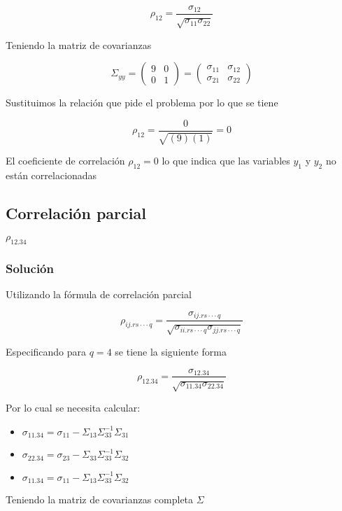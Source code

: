 $$
\rho_{12}=\frac{\sigma_{12}}{\sqrt{\sigma_{11}\sigma_{22}}}
$$

Teniendo la matriz de covarianzas

$$
\Sigma_{yy}=
\begin{pmatrix}
9 & 0 \\
0 & 1
\end{pmatrix} =
\begin{pmatrix}
\sigma_{11} & \sigma_{12} \\
\sigma_{21} & \sigma_{22}
\end{pmatrix}
$$

Sustituimos la relación que pide el problema por lo que se tiene

$$
\rho_{12}=\frac{0}{\sqrt{(9)(1)}}=0
$$

El coeficiente de correlación $\rho_{12}=0$ lo que indica que las variables $y_1$ y $y_2$ no están correlacionadas

\subsection{Correlación parcial}

$\rho_{12.34}$

\subsubsection{Solución}

Utilizando la fórmula de correlación parcial 

$$
\rho_{ij.rs \cdot \cdot \cdot q}=\frac{\sigma_{ij.rs \cdot \cdot \cdot q}}{\sqrt{\sigma_{ii.rs \cdot \cdot \cdot q}\sigma_{jj.rs \cdot \cdot \cdot q}}}
$$

Especificando para $q=4$ se tiene la siguiente forma

$$
\rho_{12.34}=\frac{\sigma_{12.34}}{\sqrt{\sigma_{11.34}\sigma_{22.34}}}
$$

Por lo cual se necesita calcular:\\

\begin{itemize}
    \item $\sigma_{11.34}=\sigma_{11}-\Sigma_{13}\Sigma_{33}^{-1} \Sigma_{31}$
    \item $\sigma_{22.34}=\sigma_{23}-\Sigma_{33}\Sigma_{33}^{-1} \Sigma_{32}$
    \item $\sigma_{11.34}=\sigma_{11}-\Sigma_{13}\Sigma_{33}^{-1} \Sigma_{32}$
\end{itemize}

Teniendo la matriz de covarianzas completa $\Sigma$

